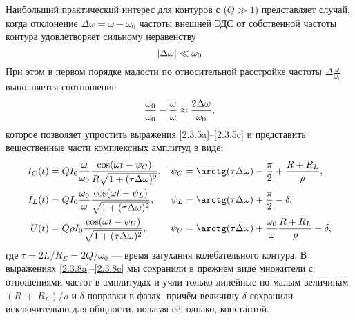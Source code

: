 Наибольший практический интерес для контуров с 
($Q\gg1$) представляет случай, когда отклонение $\Delta\omega=\omega-\omega_0$ частоты
внешней ЭДС от собственной частоты контура удовлетворяет сильному неравенству
\begin{equation}\eqmark{2.3.6}
|\Delta\omega|\ll \omega_0
\end{equation}
При этом в первом порядке малости по относительной расстройке частоты 
$\Delta\frac{\omega}{\omega_0}$ выполняется соотношение
\begin{equation}\eqmark{2.3.7}
\frac{\omega_0}{\omega_0}-\frac{\omega}{\omega}\approx\frac{2\Delta\omega}{\omega_0},
\end{equation}
которое позволяет упростить выражения \eqref{2.3.5a}--\eqref{2.3.5c} 
и представить вещественные части комплексных амплитуд в виде:
\begin{align}
			\eqmark{2.3.8a}
			I_C(t) &= QI_0\dfrac{\omega}{\omega_0}
                \dfrac{\cos(\omega t-\psi_C)}{R\sqrt{1+(\tau\Delta\omega)^2}}, &
            \psi_C &=
                \arctg(\tau\Delta\omega)-\dfrac{\pi}{2}+\dfrac{R+R_L}{\rho}, \\
			\eqmark{2.3.8b}
			I_L(t) &= QI_0\dfrac{\omega_0}{\omega} 
                \dfrac{\cos(\omega t-\psi_L)}{\sqrt{1+(\tau\Delta\omega)^2}}, &
            \psi_L &= \arctg(\tau\Delta\omega)+\dfrac{\pi}{2}-\delta, \\
			\eqmark{2.3.8c}
			U(t) &= Q\rho I_0 \dfrac{\cos(\omega t-\psi_U)}{%
                \sqrt{1+(\tau\Delta\omega)^2}}, &
            \psi_U &=\arctg(\tau\Delta\omega)+
                \dfrac{\omega_0}{\omega}\dfrac{R+R_L}{\rho}-\delta,
\end{align}
%
где $\tau=2L/R_{\Sigma}=2Q/\omega_0$ --- время затухания
колебательного контура. В выражениях \eqref{2.3.8a}--\eqref{2.3.8c} 
мы сохранили в прежнем виде множители с отношениями частот в амплитудах и учли только линейные по малым
величинам $(R~+~R_L)/\rho$ и $\delta$ поправки в фазах, причём величину $\delta$
сохранили исключительно для общности, полагая её, однако, константой.

